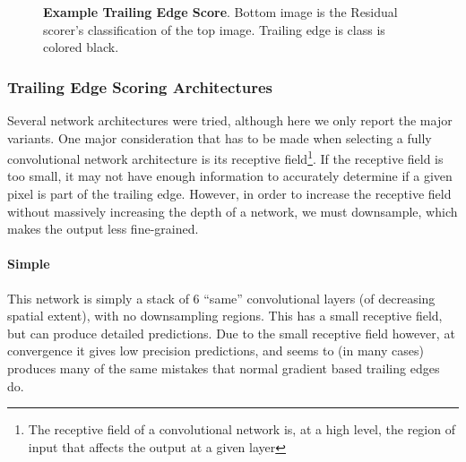 \begin{figure}[t]%
\centering
{}
\newline
{}
\caption{\textbf{Example Trailing Edge Score}. Bottom image is the Residual scorer's classification of the top image. Trailing edge is class is colored black.}
\label{fig:example_te_score_annotres}
\end{figure}



\subsubsection{Trailing Edge Scoring Architectures} 
\label{sec:te_arch}

Several network architectures were tried, although here we only report the major variants.
One major consideration that has to be made when selecting a fully convolutional network architecture is its receptive field\footnote{The receptive field of a convolutional network is, at a high level, the region of input that affects the output at a given layer}.
If the receptive field is too small, it may not have enough information to accurately determine if a given pixel is part of the trailing edge.
However, in order to increase the receptive field without massively increasing the depth of a network, we must downsample, which makes the output less fine-grained.

\paragraph{Simple}
This network is simply a stack of $6$ ``same'' convolutional layers (of decreasing spatial extent), with no downsampling regions.
This has a small receptive field, but can produce detailed predictions.
Due to the small receptive field however, at convergence it gives low precision predictions, and seems to (in many cases) produces many of the same mistakes that normal gradient based trailing edges do.

